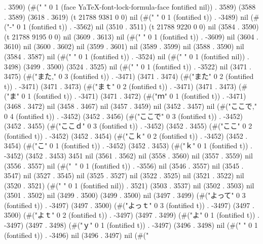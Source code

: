 . 3590) (#(" " 0 1 (face YaTeX-font-lock-formula-face fontified nil)) . 3589) (3588 . 3589) (3618 . 3619) (t 21788 9381 0 0) nil (#(" " 0 1 (fontified t)) . -3489) nil (#("-" 0 1 (fontified t)) . -3562) nil (3510 . 3511) (t 21788 9220 0 0) nil (3584 . 3590) (t 21788 9195 0 0) nil (3609 . 3613) nil (#(" " 0 1 (fontified t)) . -3609) nil (3604 . 3610) nil (3600 . 3602) nil (3599 . 3601) nil (3589 . 3599) nil (3588 . 3590) nil (3584 . 3587) nil (#("
" 0 1 (fontified t)) . -3524) nil (#(" " 0 1 (fontified nil)) . 3498) (3499 . 3500) (3524 . 3525) nil (#("
" 0 1 (fontified t)) . -3522) nil (3471 . 3475) (#("また," 0 3 (fontified t)) . -3471) (3471 . 3474) (#("また" 0 2 (fontified t)) . -3471) (3471 . 3473) (#("まｔ" 0 2 (fontified t)) . -3471) (3471 . 3473) (#("ま" 0 1 (fontified t)) . -3471) (3471 . 3472) (#("ｍ" 0 1 (fontified t)) . -3471) (3468 . 3472) nil (3458 . 3467) nil (3457 . 3459) nil (3452 . 3457) nil (#("ここで," 0 4 (fontified t)) . -3452) (3452 . 3456) (#("ここで" 0 3 (fontified t)) . -3452) (3452 . 3455) (#("ここｄ" 0 3 (fontified t)) . -3452) (3452 . 3455) (#("ここ" 0 2 (fontified t)) . -3452) (3452 . 3454) (#("こｋ" 0 2 (fontified t)) . -3452) (3452 . 3454) (#("こ" 0 1 (fontified t)) . -3452) (3452 . 3453) (#("ｋ" 0 1 (fontified t)) . -3452) (3452 . 3453) 3451 nil (3561 . 3562) nil (3558 . 3560) nil (3557 . 3559) nil (3556 . 3557) nil (#("~" 0 1 (fontified t)) . -3556) nil (3546 . 3557) nil (3545 . 3547) nil (3527 . 3545) nil (3525 . 3527) nil (3522 . 3525) nil (3521 . 3522) nil (3520 . 3521) (#(" " 0 1 (fontified nil)) . 3521) (3503 . 3537) nil (3502 . 3503) nil (3501 . 3502) nil (3499 . 3500) (3499 . 3500) nil (3497 . 3499) (#("よって" 0 3 (fontified t)) . -3497) (3497 . 3500) (#("よっｔ" 0 3 (fontified t)) . -3497) (3497 . 3500) (#("よｔ" 0 2 (fontified t)) . -3497) (3497 . 3499) (#("よ" 0 1 (fontified t)) . -3497) (3497 . 3498) (#("ｙ" 0 1 (fontified t)) . -3497) (3496 . 3498) nil (#("
" 0 1 (fontified t)) . -3496) nil (3496 . 3497) nil (#("
